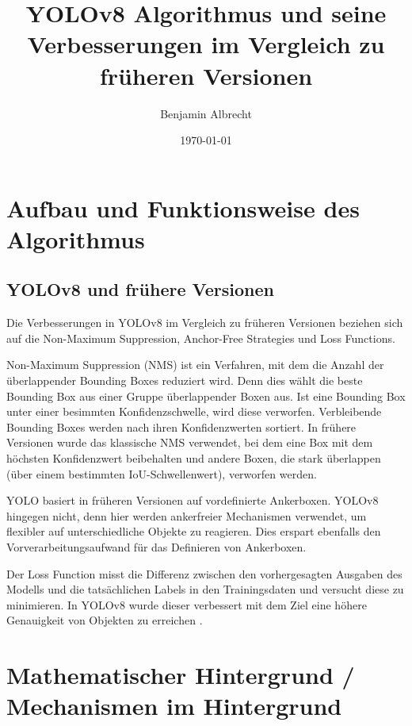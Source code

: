 \documentclass[a4paper,12pt]{article}
\title{YOLOv8 Algorithmus und seine Verbesserungen im Vergleich zu früheren Versionen}
\author{Benjamin Albrecht}
\date{\today}
\begin{document}
\sloppy
\maketitle
\tableofcontents

\section{Aufbau und Funktionsweise des Algorithmus}
\subsection{YOLOv8 und frühere Versionen}
Die Verbesserungen in YOLOv8 im Vergleich zu früheren Versionen beziehen sich auf die Non-Maximum Suppression, Anchor-Free Strategies und Loss Functions.\par\vspace{0.5em}

\noindent Non-Maximum Suppression (NMS) ist ein Verfahren, mit dem die Anzahl der überlappender Bounding Boxes reduziert wird. Denn dies wählt die beste Bounding Box aus einer Gruppe überlappender Boxen aus. Ist eine Bounding Box unter einer besimmten Konfidenzschwelle, wird diese verworfen. Verbleibende Bounding Boxes werden nach ihren Konfidenzwerten sortiert. In frühere Versionen wurde das klassische NMS verwendet, bei dem eine Box mit dem höchsten Konfidenzwert beibehalten und andere Boxen, die stark überlappen (über einem bestimmten IoU-Schwellenwert), verworfen werden.\par\vspace{0.5em}

\noindent YOLO basiert in früheren Versionen auf vordefinierte Ankerboxen. YOLOv8 hingegen nicht, denn hier werden ankerfreier Mechanismen verwendet, um flexibler auf unterschiedliche Objekte zu reagieren. Dies erspart ebenfalls den Vorverarbeitungsaufwand für das Definieren von Ankerboxen.\par\vspace{0.5em}
\noindent Der Loss Function misst die Differenz zwischen den vorhergesagten Ausgaben des Modells und die tatsächlichen Labels in den Trainingsdaten und versucht diese zu minimieren. In YOLOv8 wurde dieser verbessert mit dem Ziel eine höhere Genauigkeit von Objekten zu erreichen \cite{terven2023comprehensive, reis2023real, safaldin2024improved}.\par\vspace{0.5em}


\section{Mathematischer Hintergrund / Mechanismen im Hintergrund}
\end{document}
